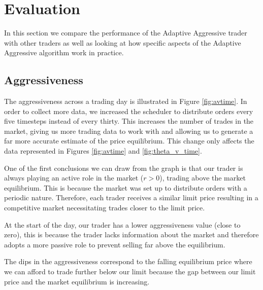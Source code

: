 \documentclass[preprint]{acm_proc_article-sp} %
\begin{document}
\section{Evaluation} \label{sec:evaluation}
In this section we compare the performance of the Adaptive Aggressive trader
with other traders as well as looking at how specific aspects of the Adaptive
Aggressive algorithm work in practice.\\


\subsection{Aggressiveness} \label{sec:evaluation_aggressiveness} 
The aggressiveness across a trading day is illustrated in Figure \ref{fig:avtime}.
In order to collect more data, we
increased the scheduler to distribute orders every five timesteps instead of
every thirty. This increases the number of trades in the market, giving us more
trading data to work with and allowing us to generate a far more accurate
estimate of the price equilibrium. This change only affects the data
represented in Figures \ref{fig:avtime} and \ref{fig:theta_v_time}.

One of the first conclusions we can draw from the graph is that our trader is
always playing an active role in the market ($r > 0$), trading above the market
equilibrium. This is because the market was set up to distribute orders with a
periodic nature. Therefore, each trader receives a similar limit price
resulting in a competitive market necessitating trades closer to the limit
price. 

At the start of the day, our trader has a lower aggressiveness value (close to
zero), this is because the trader lacks information about the market and
therefore adopts a more passive role to prevent selling far above the
equilibrium.

The dips in the aggressiveness correspond to the falling equilibrium price
where we can afford to trade further below our limit because the gap between
our limit price and the market equilibrium is increasing.
\end{document}
